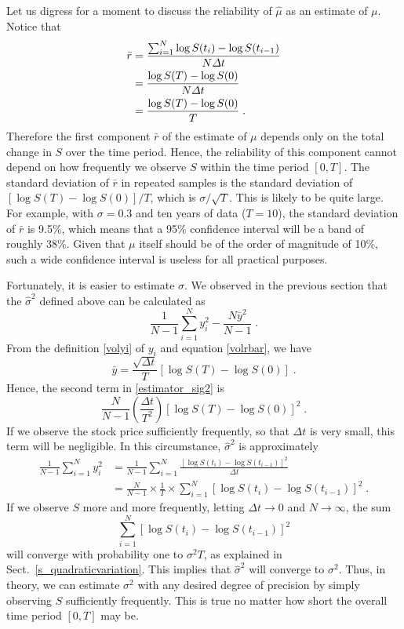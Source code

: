 Let us digress for a moment to discuss the reliability of $\hat{\mu}$ as an estimate of $\mu$.  Notice that 
\begin{align}
\bar{r} 
&= \frac{\sum_{i=1}^N \log S(t_i)-\log S(t_{i-1})}{N\varDelta t}\notag\\
&=   \frac{\log S(T)-\log S(0)}{N\varDelta t}\notag\\
& = \frac{\log S(T)-\log S(0)}{T}\;.\label{volrbar}
\end{align}
Therefore the first component $\bar{r}$ of the estimate of $\mu$ depends only on the total change in $S$ over the time period.  Hence, the reliability of this component cannot depend on how frequently we observe $S$ within the time period $[0,T]$.  The standard deviation of $\bar{r}$ in repeated samples
is the standard deviation of $[\log S(T)-\log S(0)]/T$, which is $\sigma/\sqrt{T}$.  This is likely to be quite large.  For example, with $\sigma =0.3$ and ten years of data ($T=10$), the standard deviation of $\bar{r}$ is 9.5\%, which means that a 95\% confidence interval will be a band of roughly 38\%.  Given that $\mu$ itself should be of the order of magnitude of 10\%, such a wide confidence interval is useless for all practical purposes.

Fortunately, it is easier to estimate $\sigma$.  We observed in the previous section that the $\hat{\sigma}^2$ defined above can be calculated as
\begin{equation}\label{estimator_sig2}
\frac{1}{N-1}\sum_{i=1}^N y_i^2 - \frac{N\bar{y}^2}{N-1}\;.
\end{equation}
From the definition \eqref{volyi} of $y_i$ and equation \eqref{volrbar}, we have
$$\bar{y} =  \frac{\sqrt{\varDelta t}}{T}[\log S(T)-\log S(0)]\; .$$
Hence, the second term in \eqref{estimator_sig2} is
$$ \frac{N}{N-1}\left(\frac{\varDelta t}{T^2}\right)[\log S(T)-\log S(0)]^2\; .$$
If we observe the stock price sufficiently frequently, so that $\varDelta t$ is very small, this term will be negligible.  In this circumstance,  $\hat{\sigma}^2$ is approximately
\begin{align}
\frac{1}{N-1}\sum_{i=1}^N y_i^2 &= \frac{1}{N-1}\sum_{i=1}^N \frac{[\log S(t_i)-\log S(t_{i-1})]^2}{\varDelta t}\\
&= \frac{N}{N-1}\times \frac{1}{T}\times \sum_{i=1}^N [\log S(t_i)-\log S(t_{i-1})]^2 \label{estimator_sig2_3}\;.
\end{align}
If we observe $S$ more and more frequently, letting $\varDelta t \rightarrow 0$ and $N \rightarrow \infty$, the sum 
$$\sum_{i=1}^N [\log S(t_i)-\log S(t_{i-1})]^2$$
will converge with probability one to $\sigma^2T$, as explained in Sect.~\ref{s_quadraticvariation}.  This implies that $\hat{\sigma}^2$ will converge to $\sigma^2$.  Thus, in theory, we can estimate $\sigma^2$ with any desired degree of precision by simply observing $S$ sufficiently frequently.  This is true no matter how short the overall time period $[0,T]$ may be.  


